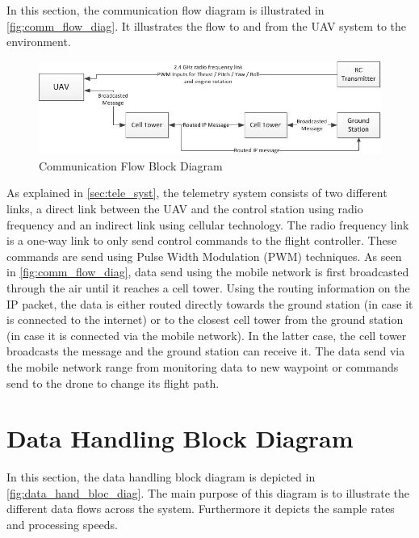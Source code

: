 In this section, the communication flow diagram is illustrated in \autoref{fig:comm_flow_diag}. It illustrates the flow to and from the UAV system to the environment. 

\begin{figure}[ht]
    \centering
    \includegraphics[width=.8\textwidth]{./CommandDataHandling/Figures/CommFlowDiagram.jpg}
    \caption{Communication Flow Block Diagram}
    \label{fig:comm_flow_diag}
\end{figure}

As explained in \autoref{sec:tele_syst}, the telemetry system consists of two different links, a direct link between the UAV and the control station using radio frequency and an indirect link using cellular technology. The radio frequency link is a one-way link to only send control commands to the flight controller. These commands are send using Pulse Width Modulation (PWM) techniques. As seen in \autoref{fig:comm_flow_diag}, data send using the mobile network is first broadcasted through the air until it reaches a cell tower. Using the routing information on the IP packet, the data is either routed directly towards the ground station (in case it is connected to the internet) or to the closest cell tower from the ground station (in case it is connected via the mobile network). In the latter case, the cell tower broadcasts the message and the ground station can receive it. The data send via the mobile network range from monitoring data to new waypoint or commands send to the drone to change its flight path. 


\section{Data Handling Block Diagram}
\label{sec:data_hand_bloc_diag}

In this section, the data handling block diagram is depicted in \autoref{fig:data_hand_bloc_diag}. The main purpose of this diagram is to illustrate the different data flows across the system. Furthermore it depicts the sample rates and processing speeds. 

